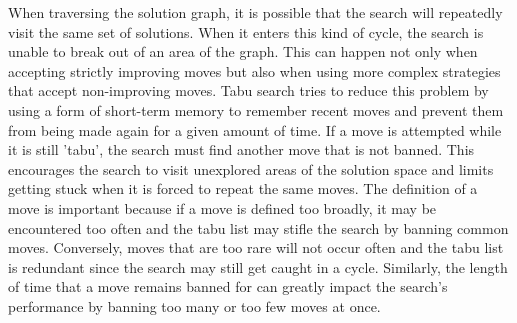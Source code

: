 When traversing the solution graph, it is possible that the search will repeatedly visit the same set of solutions. When it enters this kind of cycle, the search is unable to break out of an area of the graph. This can happen not only when accepting strictly improving moves but also when using more complex strategies that accept non-improving moves. Tabu search \citep{glover1989tabu} tries to reduce this problem by using a form of short-term memory to remember recent moves and prevent them from being made again for a given amount of time. If a move is attempted while it is still 'tabu', the search must find another move that is not banned. This encourages the search to visit unexplored areas of the solution space and limits getting stuck when it is forced to repeat the same moves. The definition of a move is important because if a move is defined too broadly, it may be encountered too often and the tabu list may stifle the search by banning common moves. Conversely, moves that are too rare will not occur often and the tabu list is redundant since the search may still get caught in a cycle. Similarly, the length of time that a move remains banned for can greatly impact the search's performance by banning too many or too few moves at once.



